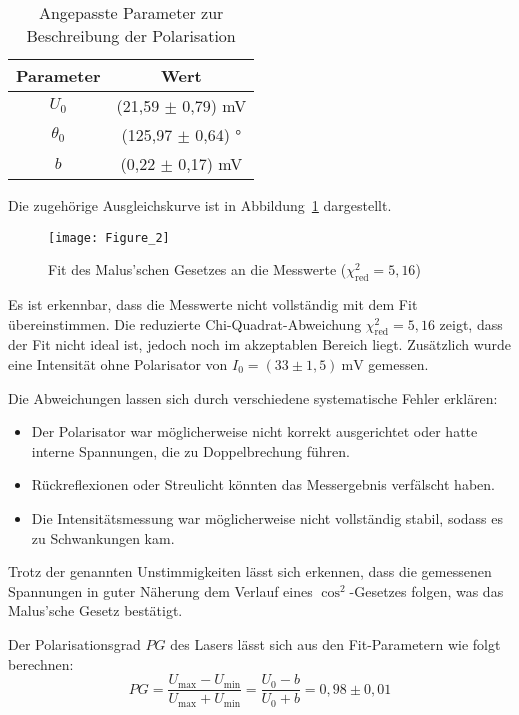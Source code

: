 \begin{table}[htbp]
    \centering
    \begin{tabular}{c|c}
        Parameter & Wert \\
        \hline
        $U_0$ & (21{,}59 \(\pm\) 0{,}79) mV \\
        $\theta_0$ & (125{,}97 \(\pm\) 0{,}64) ° \\
        $b$ & (0{,}22 \(\pm\) 0{,}17) mV \\
    \end{tabular}
    \caption{Angepasste Parameter zur Beschreibung der Polarisation}
    \label{tab:WertePol}
\end{table}

Die zugehörige Ausgleichskurve ist in Abbildung~\ref{fig:PolarisationFigur} dargestellt.

\begin{figure}[H]
    \centering
    \texttt{[image: Figure\_2]}
    \caption{Fit des Malus’schen Gesetzes an die Messwerte ($\chi^2_\text{red} = 5{,}16$)}
    \label{fig:PolarisationFigur}
\end{figure}

Es ist erkennbar, dass die Messwerte nicht vollständig mit dem Fit übereinstimmen.
Die reduzierte Chi-Quadrat-Abweichung $\chi^2_\text{red} = 5{,}16$ zeigt, dass der Fit nicht ideal ist, jedoch noch im akzeptablen Bereich liegt. 
Zusätzlich wurde eine Intensität ohne Polarisator von $I_0 = (33 \pm 1{,}5)~\text{mV}$ gemessen.

Die Abweichungen lassen sich durch verschiedene systematische Fehler erklären:

\begin{itemize}
    \item Der Polarisator war möglicherweise nicht korrekt ausgerichtet oder hatte interne Spannungen, die zu Doppelbrechung führen.
    \item Rückreflexionen oder Streulicht könnten das Messergebnis verfälscht haben.
    \item Die Intensitätsmessung war möglicherweise nicht vollständig stabil, sodass es zu Schwankungen kam.
\end{itemize}

Trotz der genannten Unstimmigkeiten lässt sich erkennen, dass die gemessenen Spannungen in guter Näherung dem Verlauf eines $\cos^2$-Gesetzes folgen, was das Malus’sche Gesetz bestätigt.

Der Polarisationsgrad \( PG \) des Lasers lässt sich aus den Fit-Parametern wie folgt berechnen:
\begin{equation*}
    PG = \frac{U_\text{max} - U_\text{min}}{U_\text{max} + U_\text{min}} = \frac{U_0 - b}{U_0 + b} = 0{,}98 \pm 0{,}01
\end{equation*}

